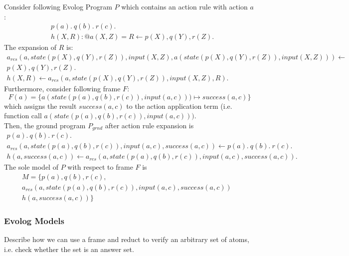 \begin{example}
\label{ex:action-rule-expansion}
Consider following Evolog Program $P$ which contains an action rule with action $a$:
\begin{align*}
	&p(a).~q(b).~r(c). \\
	&h(X, R) : @a(X, Z) = R \leftarrow p(X), q(Y), r(Z).
\end{align*}
The expansion of $R$ is:
\begin{align*}
	a_{res}(a, \mathit{state}(p(X), q(Y), r(Z)), \mathit{input}(X, Z), a(\mathit{state}(p(X), q(Y), r(Z)), \mathit{input}(X, Z))) \leftarrow& \\
	p(X), q(Y), r(Z).& \\
	h(X, R) \leftarrow a_{res}(a, \mathit{state}(p(X), q(Y), r(Z)), \mathit{input}(X, Z), R).&
\end{align*}
Furthermore, consider following frame $F$:
\[
	F(a) = \{a(\mathit{state}(p(a), q(b), r(c)), \mathit{input}(a, c))) \mapsto \mathit{success}(a, c)\}
\]
which assigns the result $\mathit{success}(a, c)$ to the action application term (i.e. function call $a(\mathit{state}(p(a), q(b), r(c)), \mathit{input}(a, c)))$. \\

Then, the ground program $P_{grnd}$ after action rule expansion is
\begin{align*}
	p(a).~q(b).~r(c).& \\
	a_{res}(a, \mathit{state}(p(a), q(b), r(c)), \mathit{input}(a, c), \mathit{success}(a, c)) \leftarrow p(a).~q(b).~r(c).& \\
	h(a, \mathit{success}(a, c)) \leftarrow a_{res}(a, \mathit{state}(p(a), q(b), r(c)), \mathit{input}(a, c), \mathit{success}(a, c)).&
\end{align*}
The sole model of $P$ with respect to frame $F$ is 
\begin{align*}
	M = \{p(a), q(b), r(c),& \\
	a_{res}(a, \mathit{state}(p(a), q(b), r(c)), \mathit{input}(a, c), \mathit{success}(a, c))& \\ h(a, \mathit{success}(a, c))\}&
\end{align*}
\end{example}

\subsubsection{Evolog Models}
\label{subsubsec:evolog-action-semantics-models}

Describe how we can use a frame and reduct to verify an arbitrary set of atoms, i.e. check whether the set is an answer set.